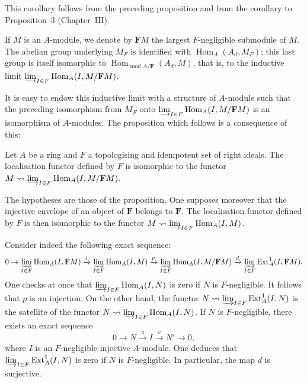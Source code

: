 This corollary follows from the preceding proposition and from the
corollary to Proposition~3 (Chapter~III).

If $M$ is an $A$-module, we denote by $\mathbf{F}M$ the largest
$F$-negligible submodule of $M$. The abelian group underlying $M_F$ is
identified with $\operatorname{Hom}_A(A_d,M_F)$; this last group is
itself isomorphic to
$\operatorname{Hom}_{\operatorname{mod} A/\mathbf{F}}(A_d,M)$, that is,
to the inductive limit
$\varinjlim_{I\in F}\operatorname{Hom}_A(I,M/\mathbf{F}M)$.

It is easy to endow this inductive limit with a structure of $A$-module
such that the preceding isomorphism from $M_F$ onto
$\varinjlim_{I\in F}\operatorname{Hom}_A(I,M/\mathbf{F}M)$ is an
isomorphism of $A$-modules. The proposition which follows is a
consequence of this:

\begin{proposition}
Let $A$ be a ring and $F$ a topologising and idempotent set of right
ideals. The localisation functor defined by $F$ is isomorphic to the
functor
$M\leadsto\varinjlim_{I\in F}\operatorname{Hom}_A(I,M/\mathbf{F}M)$.
\end{proposition}

\begin{corollary}
The hypotheses are those of the proposition. One supposes moreover that
the injective envelope of an object of $\mathbf{F}$ belongs to
$\mathbf{F}$. The localisation functor defined by $F$ is then
isomorphic to the functor
$M\leadsto\varinjlim_{I\in F}\operatorname{Hom}_A(I,M)$.
\end{corollary}

Consider indeed the following exact sequence:
\[
0\to\varinjlim_{I\in F}\operatorname{Hom}_A(I,\mathbf{F}M)
\xrightarrow{i}\varinjlim_{I\in F}\operatorname{Hom}_A(I,M)
\xrightarrow{p}\varinjlim_{I\in F}\operatorname{Hom}_A(I,M/\mathbf{F}M)
\xrightarrow{d}\varinjlim_{I\in F}\operatorname{Ext}^1_A(I,\mathbf{F}M).
\]
One checks at once that
$\varinjlim_{I\in F}\operatorname{Hom}_A(I,N)$ is zero if $N$ is
$F$-negligible. It follows that $p$ is an injection. On the other hand,
the functor
$N\leadsto\varinjlim_{I\in F}\operatorname{Ext}^1_A(I,N)$ is the
satellite of the functor
$N\leadsto\varinjlim_{I\in F}\operatorname{Hom}_A(I,N)$. If $N$ is
$F$-negligible, there exists an exact sequence
\[
0\to N\xrightarrow{u} I\xrightarrow{v} N'\to 0,
\]
where $I$ is an $F$-negligible injective $A$-module. One deduces that
$\varinjlim_{I\in F}\operatorname{Ext}^1_A(I,N)$ is zero if $N$ is
$F$-negligible. In particular, the map $d$ is surjective.


